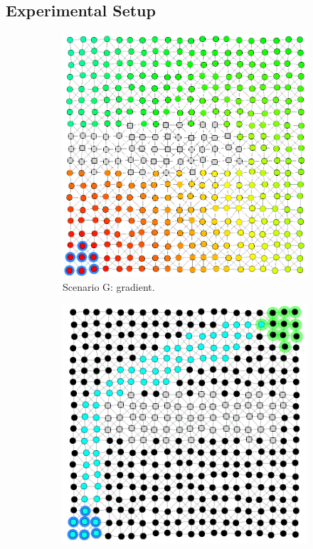 \subsection{Experimental Setup}
\begin{figure}
  \centering
    \begin{subfigure}[b]{0.49\linewidth}
        \centering
        \includegraphics[width=\textwidth]{papers/acsos2023-frp/imgs/gradient.png}
       \caption{Scenario G: gradient.}
        \label{acsos2023-frp:fig:scenario-g}
    \end{subfigure}
    \begin{subfigure}[b]{0.49\linewidth}
        \centering
        \includegraphics[width=\textwidth]{papers/acsos2023-frp/imgs/channel.png}

\end{subfigure}
\end{figure}
